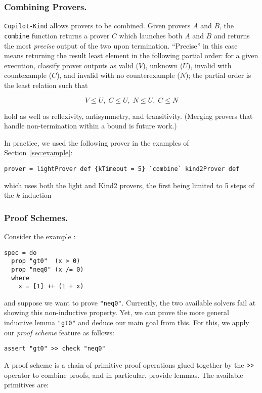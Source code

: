 \subsubsection{Combining Provers.}\label{combining-provers}
\texttt{Copilot-Kind} allows provers to be combined. Given provers $A$ and $B$,
the \texttt{combine} function returns a prover $C$ which launches both $A$ and
$B$ and returns the most \emph{precise} output of the two upon
termination. ``Precise'' in this case means returning the result least element
in the following partial order: for a given execution, classify prover outputs
as valid ($V$), unknown ($U$), invalid with countexample ($C$), and invalid with
no counterexample ($N$); the partial order is the least relation such that

$$V \leq U, \; C \leq U, \; N \leq U, \; C \leq N$$

\noindent
hold as well as reflexivity, antisymmetry, and transitivity. (Merging provers
that handle non-termination within a bound is future work.)

In practice, we used the following prover in the examples of Section~\ref{sec:example}:
\begin{lstlisting}[frame=single]
prover = lightProver def {kTimeout = 5} `combine` kind2Prover def
\end{lstlisting}
which uses both the light and Kind2 provers, the first being limited to 5 steps of the $k$-induction 

\subsubsection{Proof Schemes.}\label{proof-schemes}

Consider the example :
\begin{lstlisting}[frame=single]
spec = do
  prop "gt0"  (x > 0)
  prop "neq0" (x /= 0)
  where
    x = [1] ++ (1 + x)

\end{lstlisting}
and suppose we want to prove \texttt{"neq0"}. Currently, the two available solvers fail at showing this non-inductive property. Yet, we can prove the more general
inductive lemma \texttt{"gt0"} and deduce our main goal from this. For
this, we apply our \emph{proof scheme} feature as follows:

\begin{lstlisting}[frame=single]
assert "gt0" >> check "neq0"
\end{lstlisting}

A proof scheme is a chain of
primitive proof operations glued together by the $\texttt{\textgreater{}\textgreater{}}$
operator to combine proofs, and in particular, provide lemmas. The available primitives are:

